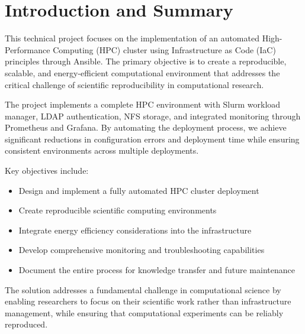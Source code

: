\documentclass[12pt,a4paper]{report}
\begin{document}
\tableofcontents
\listoffigures
\listoftables
\newpage

\chapter*{Introduction and Summary}

\begin{infocaja}
This technical project focuses on the implementation of an automated High-Performance Computing (HPC) cluster using Infrastructure as Code (IaC) principles through Ansible. The primary objective is to create a reproducible, scalable, and energy-efficient computational environment that addresses the critical challenge of scientific reproducibility in computational research.
\end{infocaja}

The project implements a complete HPC environment with Slurm workload manager, LDAP authentication, NFS storage, and integrated monitoring through Prometheus and Grafana. By automating the deployment process, we achieve significant reductions in configuration errors and deployment time while ensuring consistent environments across multiple deployments.

Key objectives include:
\begin{itemize}
    \item \textcolor{cientigo-blue}{\faCheckCircle} Design and implement a fully automated HPC cluster deployment
    \item \textcolor{cientigo-blue}{\faCheckCircle} Create reproducible scientific computing environments
    \item \textcolor{cientigo-blue}{\faCheckCircle} Integrate energy efficiency considerations into the infrastructure
    \item \textcolor{cientigo-blue}{\faCheckCircle} Develop comprehensive monitoring and troubleshooting capabilities
    \item \textcolor{cientigo-blue}{\faCheckCircle} Document the entire process for knowledge transfer and future maintenance
\end{itemize}

The solution addresses a fundamental challenge in computational science by enabling researchers to focus on their scientific work rather than infrastructure management, while ensuring that computational experiments can be reliably reproduced.
\end{document}
